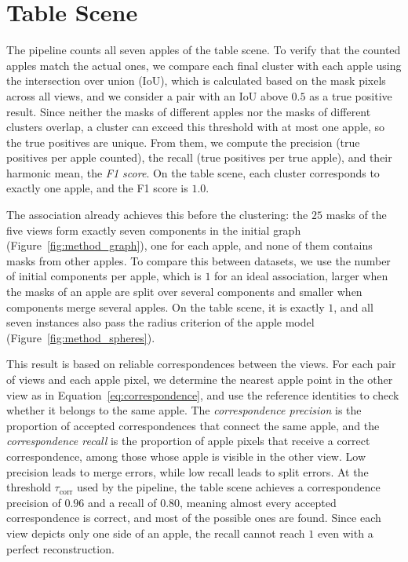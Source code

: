 \documentclass[english, egger, bsc]{vcethesis}
\begin{document}
\section{Table Scene}
\label{sec:results_table}
The pipeline counts all seven apples of the table scene. To verify that the counted apples match the actual ones, we compare each final cluster with each apple using the intersection over union (IoU), which is calculated based on the mask pixels across all views, and we consider a pair with an IoU above $0.5$ as a true positive result. Since neither the masks of different apples nor the masks of different clusters overlap, a cluster can exceed this threshold with at most one apple, so the true positives are unique. From them, we compute the precision (true positives per apple counted), the recall (true positives per true apple), and their harmonic mean, the \emph{F1 score}. On the table scene, each cluster corresponds to exactly one apple, and the F1 score is $1.0$.

The association already achieves this before the clustering: the $25$ masks of the five views form exactly seven components in the initial graph (Figure~\ref{fig:method_graph}), one for each apple, and none of them contains masks from other apples. To compare this between datasets, we use the number of initial components per apple, which is $1$ for an ideal association, larger when the masks of an apple are split over several components and smaller when components merge several apples. On the table scene, it is exactly $1$, and all seven instances also pass the radius criterion of the apple model (Figure~\ref{fig:method_spheres}).

This result is based on reliable correspondences between the views. For each pair of views and each apple pixel, we determine the nearest apple point in the other view as in Equation~\eqref{eq:correspondence}, and use the reference identities to check whether it belongs to the same apple. The \emph{correspondence precision} is the proportion of accepted correspondences that connect the same apple, and the \emph{correspondence recall} is the proportion of apple pixels that receive a correct correspondence, among those whose apple is visible in the other view. Low precision leads to merge errors, while low recall leads to split errors. At the threshold $\tau_{\mathrm{corr}}$ used by the pipeline, the table scene achieves a correspondence precision of $0.96$ and a recall of $0.80$, meaning almost every accepted correspondence is correct, and most of the possible ones are found. Since each view depicts only one side of an apple, the recall cannot reach $1$ even with a perfect reconstruction.
\end{document}
